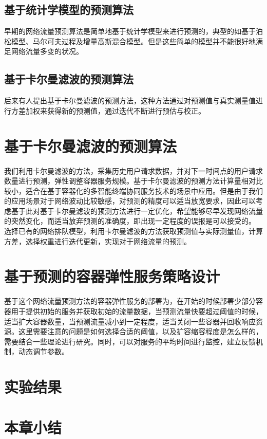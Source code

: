 \subsection{基于统计学模型的预测算法}

早期的网络流量预测算法是简单地基于统计学模型来进行预测的，典型的如基于泊松模型、马尔可夫过程及增量高斯混合模型。但是这些简单的模型并不能很好地满足网络流量多变的状况。

\subsection{基于卡尔曼滤波的预测算法}

后来有人提出基于卡尔曼滤波的预测方法，这种方法通过对预测值与真实测量值进行方差加权来获得新的预测值，通过迭代不断进行预估与校正。

\section{基于卡尔曼滤波的预测算法}\label{sec:elastic_service_Kalman_filtering}

我们利用卡尔曼滤波的方法，采集历史用户请求数据，并对下一时间点的用户请求数量进行预测，弹性调整容器服务规模。基于卡尔曼滤波的预测方法计算量相对比较小，适合在基于容器化的多智能终端协同服务技术的场景中应用。但是由于我们的应用场景对于网络波动比较敏感，对预测的精度可以适当放宽要求，因此可以考虑基于此对基于卡尔曼滤波的预测方法进行一定优化，希望能够尽早发现网络流量的突然变化，而适当放弃预测的准确度，即出现一定程度的误报是可以接受的。
选择已有的网络排队模型，利用卡尔曼滤波的方法获取预测值与实际测量值，计算方差，选择权重进行迭代更新，实现对于网络流量的预测。

\section{基于预测的容器弹性服务策略设计}\label{sec:elastic_service_strategy}

基于这个网络流量预测方法的容器弹性服务的部署为，在开始的时候部署少部分容器用于提供初始的服务并获取初始的流量数据，当预测流量快要超过阈值的时候，适当扩大容器数量，当预测流量减小到一定程度，适当关闭一些容器并回收响应资源。这里需要注意的问题是如何选择合适的阈值，以及扩容缩容程度是怎么样的，需要结合一些理论进行研究。同时，可以对服务的平均时间进行监控，建立反馈机制，动态调节参数。

\section{实验结果}\label{sec:elastic_service_experiment_results}
\section{本章小结}\label{sec:elastic_service_summary}